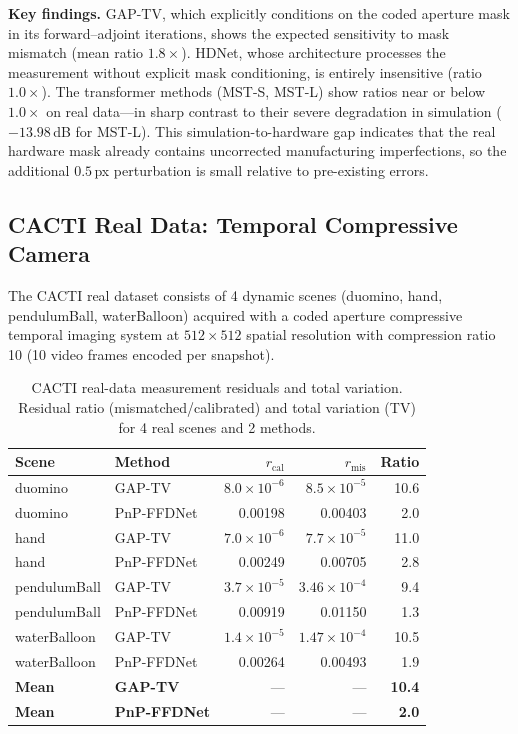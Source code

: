 \documentclass[11pt]{article}
\begin{document}
\noindent\textbf{Key findings.}
GAP-TV, which explicitly conditions on the coded aperture mask in its
forward--adjoint iterations, shows the expected sensitivity to mask mismatch
(mean ratio $1.8\times$).  HDNet, whose architecture processes the
measurement without explicit mask conditioning, is entirely insensitive
(ratio $1.0\times$).  The transformer methods (MST-S, MST-L) show ratios
near or below $1.0\times$ on real data---in sharp contrast to their severe
degradation in simulation ($-13.98$\,dB for MST-L).  This
simulation-to-hardware gap indicates that the real hardware mask already
contains uncorrected manufacturing imperfections, so the additional
$0.5$\,px perturbation is small relative to pre-existing errors.


\subsection{CACTI Real Data: Temporal Compressive Camera}

The CACTI real dataset consists of 4 dynamic scenes (duomino, hand,
pendulumBall, waterBalloon) acquired with a coded aperture compressive
temporal imaging system at $512 \times 512$ spatial resolution with
compression ratio 10 (10 video frames encoded per snapshot).

\begin{table}[htbp]
\centering
\caption{CACTI real-data measurement residuals
and total variation.  Residual ratio (mismatched/calibrated) and
total variation (TV) for 4 real scenes and 2 methods.}
\label{tab:cacti_real}
\begin{tabular}{l l r r r}
\toprule
\textbf{Scene} & \textbf{Method} &
  \textbf{$r_{\mathrm{cal}}$} & \textbf{$r_{\mathrm{mis}}$} &
  \textbf{Ratio} \\
\midrule
duomino       & GAP-TV     & $8.0\times10^{-6}$ & $8.5\times10^{-5}$ & 10.6 \\
duomino       & PnP-FFDNet & 0.00198             & 0.00403             &  2.0 \\
\midrule
hand          & GAP-TV     & $7.0\times10^{-6}$ & $7.7\times10^{-5}$ & 11.0 \\
hand          & PnP-FFDNet & 0.00249             & 0.00705             &  2.8 \\
\midrule
pendulumBall  & GAP-TV     & $3.7\times10^{-5}$ & $3.46\times10^{-4}$ &  9.4 \\
pendulumBall  & PnP-FFDNet & 0.00919             & 0.01150             &  1.3 \\
\midrule
waterBalloon  & GAP-TV     & $1.4\times10^{-5}$ & $1.47\times10^{-4}$ & 10.5 \\
waterBalloon  & PnP-FFDNet & 0.00264             & 0.00493             &  1.9 \\
\midrule
\textbf{Mean} & \textbf{GAP-TV}     & --- & --- & \textbf{10.4} \\
\textbf{Mean} & \textbf{PnP-FFDNet} & --- & --- & \textbf{2.0} \\
\bottomrule
\end{tabular}
\end{table}
\end{document}
